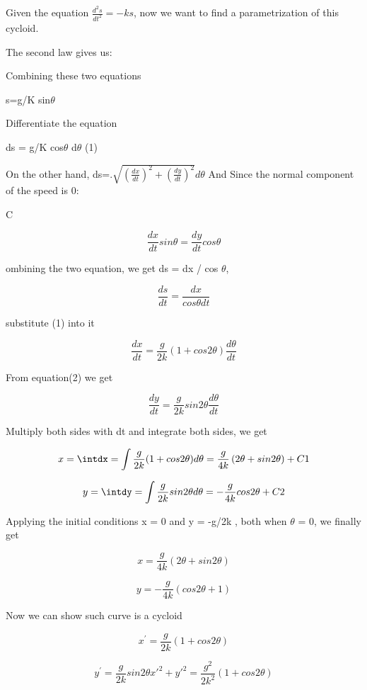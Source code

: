 \documentclass[10pt]{article}
\author{星宇 朱}
\title{}
\begin{document}
Given the equation $\frac{d^2s}{{dt}^2}=-ks$, now we want to find a
parametrization of this cycloid.

The second law gives us:

Combining these two equations

s=g/K sin$\theta{}$

Differentiate the equation

ds = g/K cos$\theta{}$ d$\theta{}$ (1)

On the other hand, ds=.$\sqrt{{(\frac{dx}{dt})}^2+{(\frac{dy}{dt})}^2}d\theta{}$
And Since the normal component of the speed is 0:

C

\begin{equation}
\frac{dx}{dt}sin\theta{}=\frac{dy}{dt}cos\theta{}
\end{equation}

ombining the two equation, we get ds = dx / cos $\theta{}$,



\[
\frac{ds}{dt}=\frac{dx}{cos\theta{}dt}
\]

substitute (1) into it



\[
\frac{dx}{dt}=\frac{g}{2k}(1+cos2\theta{})\frac{d\theta{}}{dt}
\]

From equation(2) we get



\[
\frac{dy}{dt}=\frac{g}{2k}sin2\theta{}\frac{d\theta{}}{dt}
\]

Multiply both sides with dt and integrate both sides, we get


\[
x=\intdx=\int\frac{g}{2k}(1+cos2\theta{})d\theta{}=\frac{g}{4k}\left(2\theta{}+sin2\theta{}\right)+C1
\]




\[
y=\intdy=\int\frac{g}{2k}sin2\theta{}d\theta{}=-\frac{g}{4k}cos2\theta{}+C2
\]

Applying the initial conditions x = 0 and y = -g/2k , both when $\theta{}$ = 0, 
we finally get


\[
x=\frac{g}{4k}\left(2\theta{}+sin2\theta{}\right)
\]



\[
y=-\frac{g}{4k}(cos2\theta{}+1)
\]


Now we can show such curve is a cycloid



\[
x^{'}=\frac{g}{2k}(1+cos2\theta{})
\]



\begin{equation}
y^{'}=\frac{g}{2k}sin2\theta{}{x'}^2+{y'}^2=\frac{g^2}{2k^2}(1+cos2\theta{})
\end{equation}
\end{document}
